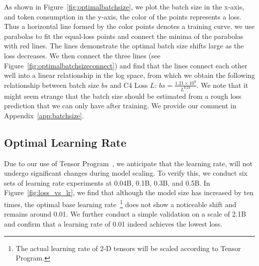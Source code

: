 As shown in Figure~\ref{fig:optimalbatchsize}, we plot the batch size in the x-axis, and token consumption in the y-axis, the color of the points represents a loss. Thus a horizontal line formed by the color points denotes a training curve. we use parabolas to fit the equal-loss points and connect the minima of the parabolas with red lines. The lines demonstrate the optimal batch size shifts large as the loss decreases. We then connect the three lines (see Figure~\ref{fig:optimalbatchsizeconnect}) and find that the lines connect each other well into a linear relationship in the log space, from which we obtain the following relationship between batch size $bs$ and C4 Loss $L$: $ bs = \frac{1.21\times10^9}{L^{6.24}}$. We note that it might seem strange that the batch size should be estimated from a rough loss prediction that we can only have after training. We provide our comment in Appendix~\ref{app:batchsize}.

\subsection{Optimal Learning Rate}
Due to our use of Tensor Program~\citep{yang2022tensor, yang2023tensor}, we anticipate that the learning rate, will not undergo significant changes during model scaling. To verify this, we conduct six sets of learning rate experiments at 0.04B, 0.1B, 0.3B, and 0.5B. In Figure~\ref{fig:loss_vs_lr}, we find that although the model size has increased by ten times, the optimal base learning rate~\footnote{The actual learning rate of 2-D tensors will be scaled according to Tensor Program.} does not show a noticeable shift and remains around 0.01. We further conduct a simple validation on a scale of 2.1B and confirm that a learning rate of 0.01 indeed achieves the lowest loss.

